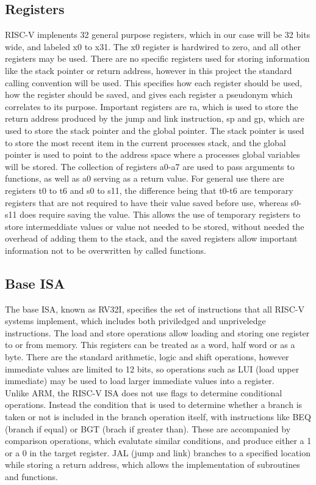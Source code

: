 \subsection{Registers}
RISC-V implenents 32 general purpose registers, which in our case will be 32 bits wide, and labeled x0 to x31. The x0 register is hardwired to zero, and all other registers may be used. There are no specific registers used for storing information like the stack pointer or return address, however in this project the standard calling convention will be used. This specifies how each register should be used, how the register should be saved, and gives each register a pseudonym which correlates to its purpose. Important registers are ra, which is used to store the return address produced by the jump and link instruction, sp and gp, which are used to store the stack pointer and the global pointer. The stack pointer is used to store the most recent item in the current processes stack, and the global pointer is used to point to the address space where a processes global variables will be stored. The collection of registers a0-a7 are used to pass arguments to functions, as well as a0 serving as a return value. For general use there are registers t0 to t6 and s0 to s11, the difference being that t0-t6 are temporary registers that are not required to have their value saved before use, whereas s0-s11 does require saving the value. This allows the use of temporary registers to store intermeddiate values or value not needed to be stored, without needed the overhead of adding them to the stack, and the saved registers allow important information not to be overwritten by called functions.\cite{riscv_unpriv}
\subsection{Base ISA}
The base ISA, known as RV32I, specifies the set of instructions that all RISC-V systems implement, which includes both priviledged and unpriveledge instructions. The load and store operations allow loading and storing one register to or from memory. This registers can be treated as a word, half word or as a byte. There are the standard arithmetic, logic and shift operations, however immediate values are limited to 12 bits, so operations such as LUI (load upper immediate) may be used to load larger immediate values into a register.\\
Unlike ARM, the RISC-V ISA does not use flags to determine conditional operations. Instead the condition that is used to determine whether a branch is taken or not is included in the branch operation itself, with instructions like BEQ (branch if equal) or BGT (brach if greater than). These are accompanied by comparison operations, which evalutate similar conditions, and produce either a 1 or a 0 in the target register. JAL (jump and link) branches to a specified location while storing a return address, which allows the implementation of subroutines and functions. 

